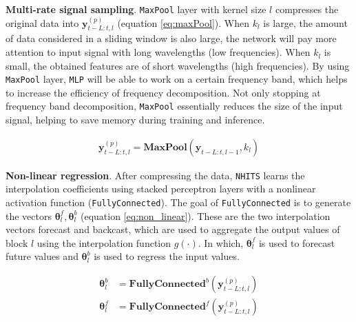 \textbf{Multi-rate signal sampling}. \verb|MaxPool| layer with kernel size $l$ compresses the original data into $\mathbf{y}_{t-L:t, l}^{(p)}$ (equation \ref{eq:maxPool}). When $k_l$ is large, the amount of data considered in a sliding window is also large, the network will pay more attention to input signal with long wavelengths (low frequencies). When $k_l$ is small, the obtained features are of short wavelengths (high frequencies). By using \verb|MaxPool| layer, \verb|MLP| will be able to work on a certain frequency band, which helps to increase the efficiency of frequency decomposition. Not only stopping at frequency band decomposition, \verb|MaxPool| essentially reduces the size of the input signal, helping to save memory during training and inference.

\begin{align}
    \mathbf{y}_{t-L:t, l}^{(p)} = \mathbf{MaxPool}\left( \mathbf{y}_{t-L:t, l-1}, k_l \right)
    \label{eq:maxPool}
\end{align}


\textbf{Non-linear regression}. After compressing the data, \verb|NHITS| learns the interpolation coefficients using stacked perceptron layers with a nonlinear activation function (\verb|FullyConnected|). The goal of \verb|FullyConnected| is to generate the vectors $\mathbf{\theta}_l^f, \mathbf{\theta}_l^b$ (equation \ref{eq:non_linear}). These are the two interpolation vectors forecast and backcast, which are used to aggregate the output values of block $l$ using the interpolation function $g(\cdot)$. In which, $\mathbf{\theta}_l^f$ is used to forecast future values and $\mathbf{\theta}_l^b$ is used to regress the input values.

\begin{align}
    \mathbf{\theta}_l^b &= \mathbf{FullyConnected}^b \left( \mathbf{y}_{t-L:t, l}^{(p)} \right)\\
    \mathbf{\theta}_l^f &= \mathbf{FullyConnected}^f \left( \mathbf{y}_{t-L:t, l}^{(p)} \right)\\
    \label{eq:non_linear}
\end{align}

